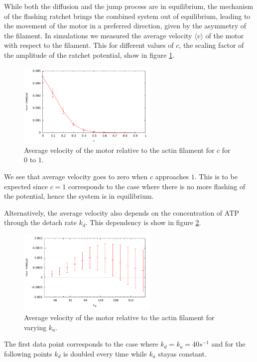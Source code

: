 \documentclass[aps,pre,onecolumn,showpacs,showkeys,a4paper]{revtex4}
\begin{document}
While both the diffusion and the jump process are in equilibrium, the mechanism of the flashing ratchet brings the combined system out of equilibrium, leading to the movement of the motor in a preferred direction, given by the asymmetry of the filament. 
In simulations we measured the average velocity $\langle v\rangle$ of the motor with respect to the filament. 
This for different values of $c$, the scaling factor of the amplitude of the ratchet potential, show in figure \ref{Fig: c_v}.
\begin{figure}[h]
\centering
\includegraphics[width=0.6\textwidth,height=!]{c_v_4heads}
\caption{Average velocity of the motor relative to the actin filament for $c$ for $0$ to $1$.} 
\label{Fig: c_v}
\end{figure}
We see that average velocity goes to zero when $c$ approaches $1$. 
This is to be expected since $c=1$ corresponds to the case where there is no more flashing of the potential, hence the system is in equilibrium.\par
Alternatively, the average velocity also depends on the concentration of ATP through the detach rate $k_{d}$. 
This dependency is show in figure \ref{Fig: v_k}.
\begin{figure}[h]
\centering
\includegraphics[width=0.6\textwidth,height=!]{v_k}
\caption{Average velocity of the motor relative to the actin filament for varying $k_{a}$.}
\label{Fig: v_k} 
\end{figure}
The first data point corresponds to the case where $k_{d} = k_{a} = 40 s^{-1}$ and for the following points $k_{d}$ is doubled every time while $k_{a}$ stayas constant. 
\end{document}

